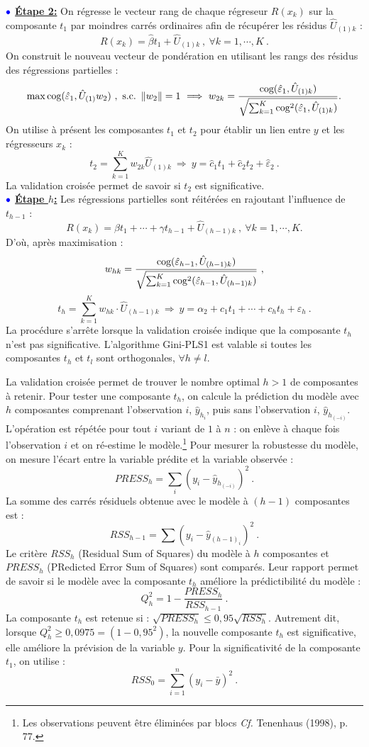 $\bulle$ \underline{\textbf{Étape 2:}}  On régresse le vecteur rang de chaque régreseur $R(x_k)$ sur la composante $t_1$ par moindres carrés ordinaires afin de récupérer les résidus $\hat{U}_{(1)k}$ : 
\[
R(x_k) = \hat{\beta}t_1 + \hat{U}_{(1)k} \ , \ \forall k = 1,\cdots, K \ .
\]
On construit le nouveau vecteur de pondération en utilisant les rangs des résidus des régressions partielles :
\[
\mathop{\mathrm{max}}\limits \text{cog}(\hat{\varepsilon}_1,\hat{U}_{(1)} w_2) \ , \ \text{s.c.} \ \left\|w_2\right\|=1 \ \Longrightarrow \ w_{2k} = \frac{\text{cog}(\hat{\varepsilon}_1,\hat{U}_{(1)k})}{\sqrt{\sum_{k=1}^K \text{cog}^2(\hat{\varepsilon}_1,\hat{U}_{(1)k})}} .
\]
On utilise à présent les composantes $t_1$ et $t_2$ pour établir un lien entre $y$ et les régresseurs $x_k$ :
\[
t_2 = \sum^K_{k=1} w_{2k} \hat{U}_{(1)k} \ \Longrightarrow \ y = \hat{c}_1 t_1 + \hat{c}_2 t_2 + \hat{\varepsilon}_2 \ .
\]
La validation croisée permet de savoir si $t_2$ est significative.\\

$\bulle$ \underline{\textbf{Étape $h$:}} Les régressions partielles sont réitérées en rajoutant l'influence de $t_{h-1}$ :
\[
R(x_k) = \beta t_1 + \cdots + \gamma t_{h-1} + \hat{U}_{(h-1)k} \ , \ \forall k = 1,\cdots, K.
\]
D'où, après maximisation :
\[
w_{hk} = \frac{\text{cog}(\hat{\varepsilon}_{h-1},\hat{U}_{(h-1)k})}{\sqrt{\sum_{k=1}^K \text{cog}^2(\hat{\varepsilon}_{h-1},\hat{U}_{(h-1)k})}} \ ,
\]
\[
t_h = \sum_{k=1}^K w_{hk}\cdot \hat{U}_{(h-1)k} \ \Longrightarrow \ y = \alpha_2 + c_1 t_1 + \cdots + c_h t_h + \varepsilon_h \ .
\]
La procédure s'arrête lorsque la validation croisée indique que la composante $t_h$ n'est pas significative. L'algorithme Gini-PLS1 est valable si toutes les composantes $t_h$ et $t_l$ sont orthogonales, $\forall h\neq l$. 

\medskip

La validation croisée permet de trouver le nombre optimal $h>1$ de composantes à retenir. Pour tester une composante $t_h$, on calcule la prédiction du modèle avec $h$ composantes comprenant l'observation $i$, $\hat{y}_{h_i}$, puis sans l'observation $i$, $\hat{y}_{h_{(-i)}}$. L'opération est répétée pour tout $i$ variant de $1$ à $n$ : on enlève à chaque fois l'observation $i$ et on ré-estime le modèle.\footnote{Les observations peuvent être éliminées par blocs \emph{Cf.} Tenenhaus (1998), p. 77.} Pour mesurer la robustesse du modèle, on mesure l'écart entre la variable prédite et la variable observée :
\[
PRESS_h =  \sum_i\left(y_i - \hat{y}_{h_{(-i)}}\right)^2 \ .
\]
La somme des carrés résiduels obtenue avec le modèle à $(h-1)$ composantes est : 
\[
RSS_{h-1} = \sum \left(y_i - \hat{y}_{(h-1)_i}\right)^2 \ .
\]
Le critère $RSS_h$ (Residual Sum of Squares) du modèle à $h$ composantes et $PRESS_h$ (PRedicted Error Sum of Squares) sont comparés. Leur rapport permet de savoir si le modèle avec la composante $t_h$ améliore la prédictibilité du modèle :
\[
Q^2_h =1 - \frac{PRESS_h}{RSS_{h-1}} \ .
\]
La composante $t_h$ est retenue si : $\sqrt{PRESS_h} \leq 0,95 \sqrt{RSS_h}$. Autrement dit, lorsque $Q^2_h \geq 0,0975 = (1 - 0,95^2)$, la nouvelle composante $t_h$ est significative, elle améliore la prévision de la variable $y$. Pour la significativité de la  composante $t_1$, on utilise :
\[
RSS_0 = \sum^{n}_{i = 1} \left(y_i - \bar{y}\right)^2  \ .
\]


